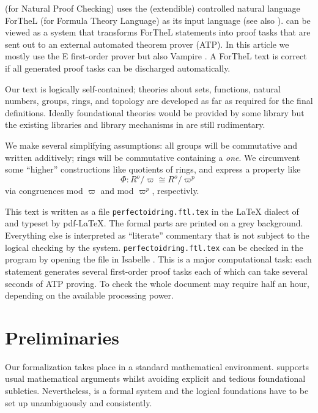 \documentclass[english,11pt]{article}
\begin{document}
\Naproche (for Natural Proof Checking) uses the (extendible) 
controlled natural language ForTheL (for Formula Theory Language)
as its
input language (see also \cite{Paskevich2007}). 
\Naproche can be viewed as a system that
transforms ForTheL statements into proof tasks that are sent out
to an external automated theorem prover (ATP). In this article we
mostly use the E first-order prover \cite{Eprover} but also Vampire \cite{Vampire}.
A ForTheL text is correct if
all generated proof tasks can be discharged automatically. 

Our text is logically self-contained; theories 
about sets, functions, natural numbers, groups, rings, and topology are
developed as far as required for the final definitions. 
Ideally foundational theories would be provided by some library
but the existing libraries and library mechanisms in \Naproche 
are still rudimentary.

We make
several simplifying assumptions:
all groups will be commutative and written additively;
rings will be commutative containing a \textit{one}.
We circumvent some ``higher'' constructions like quotients of rings,
and express a property like
\[\Phi : R^o / \varpi \cong R^o / \varpi^{p}\]
via congruences mod $\varpi$ and mod $\varpi^{p}$, respectivly.


This text is written as a file 
\texttt{perfectoidring.ftl.tex}
in the \LaTeX{} dialect of \Naproche and
typeset by pdf-\LaTeX. The formal parts are printed on a grey background. 
Everything else
is interpreted as ``literate'' commentary that is not subject to the 
logical checking by the system.
\texttt{perfectoidring.ftl.tex}
can be checked in the \Naproche program by opening the file in Isabelle
\cite{Isabelle}.
This is a major computational task: each statement generates several
first-order proof tasks each of which can take several seconds of
ATP proving. To check the whole document may require half an hour, 
depending on the available processing power.

\part{Preliminaries}

Our formalization takes place in a  standard mathematical environment. 
\Naproche supports usual mathematical arguments whilst avoiding explicit and tedious foundational
subleties. Nevertheless, \Naproche is a formal system and the logical foundations
have to be set up unambiguously and consistently.
\end{document}
